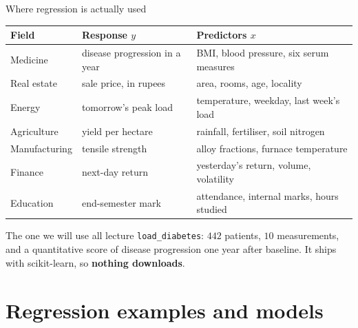 \documentclass[aspectratio=169]{beamer}
\begin{document}
\begin{frame}[shrink=8]{Where regression is actually used}
  \begin{center}\small
  \begin{tabular}{@{}lll@{}}
    \toprule
    \textbf{Field} & \textbf{Response $y$} & \textbf{Predictors $x$}\\
    \midrule
    Medicine & disease progression in a year & BMI, blood pressure, six serum
      measures\\
    Real estate & sale price, in rupees & area, rooms, age, locality\\
    Energy & tomorrow's peak load & temperature, weekday, last week's load\\
    Agriculture & yield per hectare & rainfall, fertiliser, soil nitrogen\\
    Manufacturing & tensile strength & alloy fractions, furnace temperature\\
    Finance & next-day return & yesterday's return, volume, volatility\\
    Education & end-semester mark & attendance, internal marks, hours studied\\
    \bottomrule
  \end{tabular}
  \end{center}
  \vspace{0.3em}
  \begin{block}{The one we will use all lecture}
    \small \texttt{load\_diabetes}: $442$ patients, $10$ measurements, and a
    quantitative score of disease progression one year after baseline. It
    ships with scikit-learn, so \textbf{nothing downloads}.
  \end{block}
\end{frame}

\section[Models]{Regression examples and models}
\label{sec:models}
\end{document}
